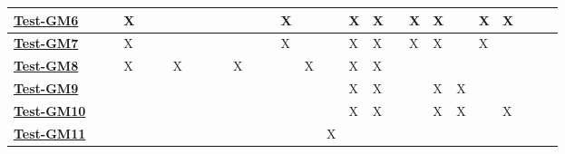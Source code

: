 \documentclass[12pt, titlepage]{article}
\begin{document}
\begin{landscape}
\begin{table}[H]
\begin{adjustwidth}{-0.0in}{-1in}
{\begin{tabular}{l|l|l|l|l|l|l|l|l|l|l|l|l|l|l|l|l|l|l|l|l|l|l|l|l|l|l|}
\multicolumn{1}{|l|}{\hyperref[Test-GM6]{\textbf{Test-GM6}}}  &              &              & X            &              &              &              &              &              &              &               &               &               & X             &               &               & X             & X             &               & X             & X             &               & X             & X           &             &             &             \\ \hline
\multicolumn{1}{|l|}{\hyperref[Test-GM17]{\textbf{Test-GM7}}}  &              &              & X            &              &              &              &              &              &              &               &               &               & X             &               &               & X             & X             &               & X             & X             &               & X             &             &             &             &             \\ \hline
\multicolumn{1}{|l|}{\hyperref[Test-GM8]{\textbf{Test-GM8}}} &              &              & X            &              &              & X            &              &              &              & X             &               &               &               & X             &               & X             & X             &               &               &               &               &               &             &             &             &             \\ \hline
\multicolumn{1}{|l|}{\hyperref[Test-GM9]{\textbf{Test-GM9}}}  &              &              &              &              &              &              &              &              &              &               &               &               &               &               &               & X             & X             &               &               & X             & X             &               &             &             &             &             \\ \hline
\multicolumn{1}{|l|}{\hyperref[Test-GM10]{\textbf{Test-GM10}}} &              &              &              &              &              &              &              &              &              &               &               &               &               &               &               & X             & X             &               &               & X             & X             &               & X           &             &             &             \\ \hline
\multicolumn{1}{|l|}{\hyperref[Test-GM11]{\textbf{Test-GM11}}}&              &              &             &         &              &           &              &              &              &               &               &               &               &               &           X  &              &              &               &               &               &               &               &           &             &             &             \\ \hline

\end{tabular}}
\end{adjustwidth}
\end{table}
\end{landscape}
\end{document}
